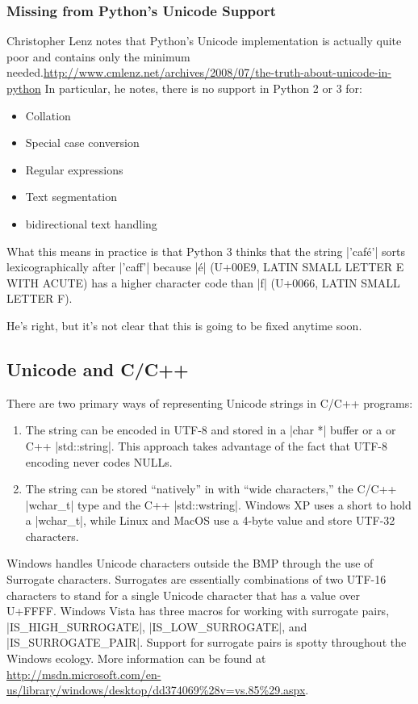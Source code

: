 \subsubsection{Missing from Python's Unicode Support}
Christopher Lenz notes that Python's Unicode implementation is actually quite poor and contains only the minimum needed.\url{http://www.cmlenz.net/archives/2008/07/the-truth-about-unicode-in-python} In particular, he notes, there is no support in Python 2 or 3 for:

\begin{itemize}
\item Collation
\item Special case conversion
\item Regular expressions
\item Text segmentation
\item bidirectional text handling
\end{itemize}

What this means in practice is that Python 3 thinks that the string |'café'| sorts lexicographically after |'caff'| because |é| (U+00E9, LATIN SMALL LETTER E WITH ACUTE) has a higher character code than |f| (U+0066, LATIN SMALL LETTER F). 

He's right, but it's not clear that this is going to be fixed anytime soon.

\subsection{Unicode and C/C++}
There are two primary ways of representing Unicode strings in C/C++ programs:
\begin{enumerate}
\item The string can be encoded in UTF-8 and stored in a |char *| buffer or a or C++ |std::string|. This approach takes advantage of the fact that UTF-8 encoding never codes NULLs.
\item The string can be stored ``natively'' in with ``wide characters,'' the C/C++ |wchar_t| type and the C++ |std::wstring|.   Windows XP uses a short to hold a |wchar_t|, while Linux and MacOS use a 4-byte value and store UTF-32 characters.  
\end{enumerate}

Windows handles Unicode characters outside the BMP through the use of Surrogate characters. Surrogates are essentially combinations of two UTF-16 characters to stand for a single Unicode character that has a value over U+FFFF. Windows Vista has three macros for working with surrogate pairs, |IS_HIGH_SURROGATE|, |IS_LOW_SURROGATE|, and |IS_SURROGATE_PAIR|. Support for surrogate pairs is spotty throughout the Windows ecology. More information can be found at \url{http://msdn.microsoft.com/en-us/library/windows/desktop/dd374069%28v=vs.85%29.aspx}.

